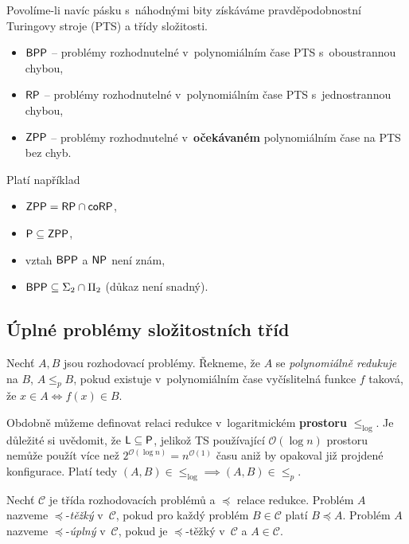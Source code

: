 Povolíme-li navíc pásku s~náhodnými bity získáváme pravděpodobnostní
Turingovy stroje (PTS) a třídy složitosti.

\begin{itemize}
    \item ${\mathsf{BPP}}$ -- problémy rozhodnutelné v~polynomiálním čase PTS s~oboustrannou chybou,
    \item ${\mathsf{RP}}$ -- problémy rozhodnutelné v~polynomiálním čase PTS s~jednostrannou chybou,
    \item ${\mathsf{ZPP}}$ -- problémy rozhodnutelné v~{\bf očekávaném}
        polynomiálním čase na PTS bez chyb.
\end{itemize}
Platí například
\begin{itemize}
    \item ${\mathsf{ZPP}} = {\mathsf{RP}} \cap {\ensuremath{\mathsf{coRP}}}$,
    \item ${\mathsf{P}} \subseteq {\ensuremath{\mathsf{ZPP}}}$,
    \item vztah ${\mathsf{BPP}}$ a ${\mathsf{NP}}$ není znám,
    \item ${\mathsf{BPP}} \subseteq \Sigma_2 \cap \Pi_2$ (důkaz není snadný).
\end{itemize}

\subsection{Úplné problémy složitostních tříd}

\begin{definition}
    Nechť $A, B$ jsou rozhodovací problémy.
    Řekneme, že $A$ se {\em polynomiálně redukuje} na $B$,
    $A \leq_p B$, pokud existuje v~polynomiálním čase vyčíslitelná
    funkce $f$ taková, že $x \in A \iff f(x) \in B$.
\end{definition}

Obdobně můžeme definovat relaci redukce v~logaritmickém {\bf prostoru}
$\leq_{\log}$. Je důležité si uvědomit, že ${\mathsf{L}} \subseteq {\ensuremath{\mathsf{P}}}$,
jelikož TS používající $\mathcal{O}(\log n)$ prostoru nemůže
použít více než $2^{\mathcal{O}(\log n)} = n^{\mathcal{O}(1)}$ času
aniž by opakoval již projdené konfigurace. Platí tedy
$(A,B) \in {\leq_{\log}} \implies (A,B) \in {\leq_p}$.

\begin{definition}
    Nechť $\mathcal{C}$ je třída rozhodovacích problémů
    a $\preceq$ relace redukce.
    Problém $A$ nazveme $\preceq$-{\em těžký} v~$\mathcal{C}$,
    pokud pro každý problém $B \in \mathcal{C}$
    platí $B \preceq A$.
    Problém $A$ nazveme $\preceq$-{\em úplný} v~$\mathcal{C}$, pokud je
    $\preceq$-těžký v~$\mathcal{C}$ a $A \in \mathcal{C}$.
\end{definition}

